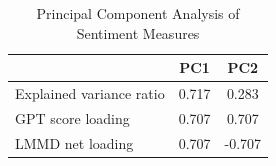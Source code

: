 \begin{table}[!htbp]
\centering
\caption{Principal Component Analysis of Sentiment Measures}
\label{tab:pca_sentiment}
\begin{tabular}{lcc}
\hline
 & PC1 & PC2 \\
\hline
Explained variance ratio & 0.717 & 0.283 \\
GPT score loading & 0.707 & 0.707 \\
LMMD net loading & 0.707 & -0.707 \\
\hline
\end{tabular}
\end{table}